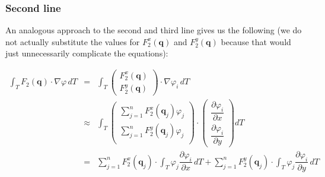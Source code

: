 \documentclass[a4paper, twoside]{article}
\newcommand{\pd}[2]{\dfrac{\partial #1}{\partial #2}}
\renewcommand{\phi}{\varphi}
\begin{document}
\subsubsection{Second line}
\label{sec:stiffness-second-line}

An analogous approach to the second and third line gives us the following (we do not actually substitute the values for $F_2^x(\mathbf{q})$ and $F_2^y(\mathbf{q})$ because that would just unnecessarily complicate the equations):

\begin{eqnarray}
  \label{eq:third-integral-second-line-1}
  \int_T F_2(\mathbf{q}) \cdot \nabla \phi \, dT & = &
  \int_T
  \begin{pmatrix}
    F_2^x(\mathbf{q}) \\ F_2^y(\mathbf{q})
  \end{pmatrix}
  \cdot \nabla \phi_i \, dT \\
  \label{eq:third-integral-second-line-2}
  & \approx &
  \int_T
  \begin{pmatrix}
    \sum_{j=1}^n F_2^x(\mathbf{q}_j) \phi_j \\
    \sum_{j=1}^n F_2^y(\mathbf{q}_j) \phi_j \\
  \end{pmatrix}
  \cdot
  \begin{pmatrix}
    \pd{\phi_i}{x} \\
    \pd{\phi_i}{y}
  \end{pmatrix} dT \\
  & = & \nonumber \sum_{j=1}^n F_2^x(\mathbf{q}_j) \cdot \int_T \phi_j \pd{\phi_i}{x} \, dT
   {}  + \nonumber \sum_{j=1}^n F_2^y(\mathbf{q}_j) \cdot \int_T \phi_j \pd{\phi_i}{y} \, dT
\end{eqnarray}
\end{document}
